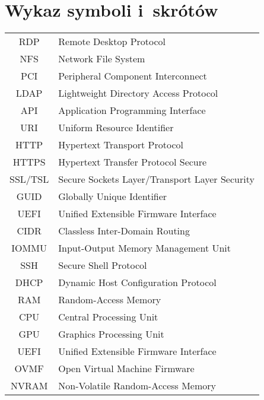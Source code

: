 \documentclass[a4paper,11pt,twoside]{report}
\begin{document}



\thispagestyle{empty}


\chapter*{Wykaz symboli i~skrótów}

\begin{tabular}{cl}
  RDP     & Remote Desktop Protocol                       \\
  NFS     & Network File System                           \\
  PCI     & Peripheral Component Interconnect             \\
  LDAP    & Lightweight Directory Access Protocol         \\
  API     & Application Programming Interface             \\
  URI     & Uniform Resource Identifier                   \\
  HTTP    & Hypertext Transport Protocol                  \\
  HTTPS   & Hypertext Transfer Protocol Secure            \\
  SSL/TSL & Secure Sockets Layer/Transport Layer Security \\
  GUID    & Globally Unique Identifier                    \\
  UEFI    & Unified Extensible Firmware Interface         \\
  CIDR    & Classless Inter-Domain Routing                \\
  IOMMU   & Input-Output Memory Management Unit           \\
  SSH     & Secure Shell Protocol                         \\
  DHCP    & Dynamic Host Configuration Protocol           \\
  RAM     & Random-Access Memory                          \\
  CPU     & Central Processing Unit                       \\
  GPU     & Graphics Processing Unit                      \\
  UEFI    & Unified Extensible Firmware Interface         \\
  OVMF    & Open Virtual Machine Firmware                 \\
  NVRAM   & Non-Volatile Random-Access Memory
\end{tabular}
\thispagestyle{empty}
\end{document}
